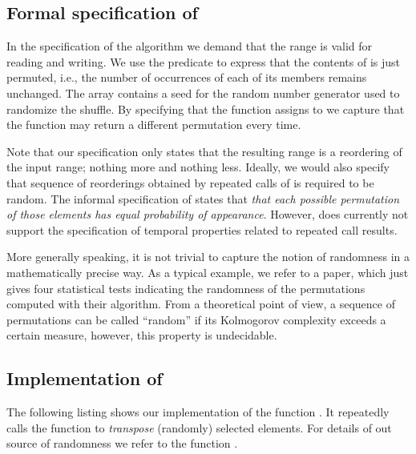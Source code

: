 

\clearpage

\subsection{Formal specification of \shuffle}

In the specification of the  algorithm we demand that the range 
is valid for reading and writing.
We use the predicate  to express that the
contents of  is just permuted, i.e., the number of occurrences
of each of its members remains unchanged. 
The array  contains a seed for the random number generator used to randomize the
shuffle.
By specifying that the function assigns to 
we capture that the function may return a different permutation every time.

Note that our specification only states that the resulting range is
a reordering of the input range; nothing more and nothing less.
Ideally, we would also specify that sequence of reorderings
obtained by repeated
calls of \shuffle is required to be random.
The informal specification\cite[\S 28.6.13]{cxx-17-draft} of \shuffle states that
\emph{that each possible permutation of those elements has 
equal probability of appearance}.
However, \acsl does currently not support the specification of
temporal properties related to repeated call results.



More generally speaking, it is not trivial to capture
the notion of randomness in a mathematically precise way.
As a typical example, we refer to a paper\cite[p.6--8]{Moses.Oakford.1963},
which just gives four statistical tests indicating the randomness of the
permutations computed with their algorithm.
From a theoretical point of view, a sequence of permutations
can be called ``random'' if its Kolmogorov complexity exceeds
a certain measure, however, this property is undecidable\cite{Li.Vitanyi.1997}.

\clearpage

\subsection{Implementation of \shuffle}

The following listing shows our implementation of the function .
It repeatedly calls the function  to \emph{transpose}
(randomly) selected elements.
For details of out source of randomness we refer to the function .

